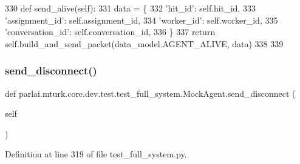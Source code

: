 \begin{DoxyCode}
330     \textcolor{keyword}{def }send\_alive(self):
331         data = \{
332             \textcolor{stringliteral}{'hit\_id'}: self.hit\_id,
333             \textcolor{stringliteral}{'assignment\_id'}: self.assignment\_id,
334             \textcolor{stringliteral}{'worker\_id'}: self.worker\_id,
335             \textcolor{stringliteral}{'conversation\_id'}: self.conversation\_id,
336         \}
337         \textcolor{keywordflow}{return} self.build\_and\_send\_packet(data\_model.AGENT\_ALIVE, data)
338 
339 
\end{DoxyCode}
\mbox{\label{classparlai_1_1mturk_1_1core_1_1dev_1_1test_1_1test__full__system_1_1MockAgent_a0ae8ffc34c8a563239335eac90dfa9ac}} 
\subsubsection{\texorpdfstring{send\+\_\+disconnect()}{send\_disconnect()}}
{\footnotesize\ttfamily def parlai.\+mturk.\+core.\+dev.\+test.\+test\+\_\+full\+\_\+system.\+Mock\+Agent.\+send\+\_\+disconnect (\begin{DoxyParamCaption}\item[{}]{self }\end{DoxyParamCaption})}



Definition at line 319 of file test\+\_\+full\+\_\+system.\+py.


